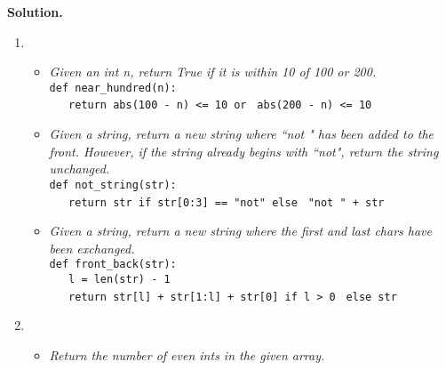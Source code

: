 \documentclass[9pt]{article}
\begin{document}
\begin{enumerate}
      \textbf{Solution.}

   

      \begin{enumerate}
         \item \begin{itemize}
                  \item \textit{Given an int n, return True if it is within 10 
                        of 100 or 200.} \\

                        \verb|def near_hundred(n):| \\
                        \verb|   return abs(100 - n) <= 10 or |
                        \verb|abs(200 - n) <= 10| \\
                  \item \textit{Given a string, return a new string where
                        ``not " has been added to the front. However, if the 
                        string already begins with ``not", return the string 
                        unchanged.} \\

                        \verb|def not_string(str):| \\
                        \verb|   return str if str[0:3] == "not" else |
                        \verb|"not " + str|
                  \item \textit{Given a string, return a new string where the 
                        first and last chars have been exchanged.} \\

                        \verb|def front_back(str):| \\
                        \verb|   l = len(str) - 1| \\
                        \verb|   return str[l] + str[1:l] + str[0] if l > 0 |
                        \verb|else str| \\
               \end{itemize}
         \item \begin{itemize}
                  \item \textit{Return the number of even ints in the given 
                        array.} \\         
   

\end{itemize}
\end{enumerate}
\end{enumerate}
\end{document}
